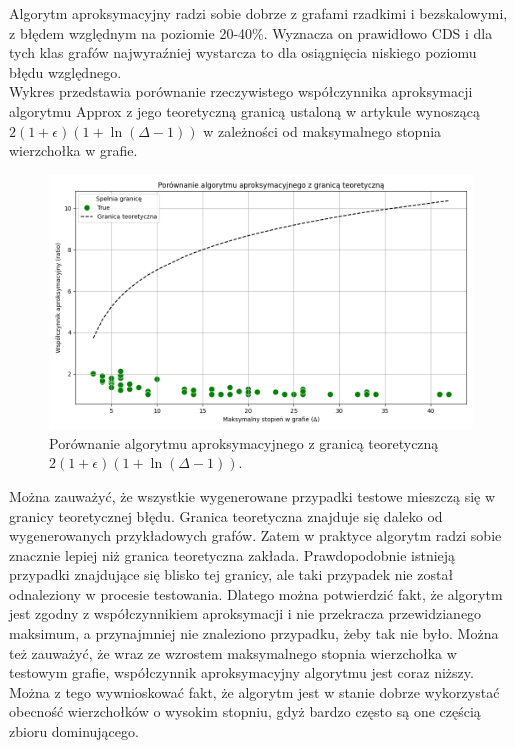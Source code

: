 Algorytm aproksymacyjny radzi sobie dobrze z grafami rzadkimi i bezskalowymi, z błędem względnym na poziomie 20-40\%. Wyznacza on prawidłowo CDS i dla tych klas grafów najwyraźniej wystarcza to dla osiągnięcia niskiego poziomu błędu względnego.\\

Wykres przedstawia porównanie rzeczywistego współczynnika aproksymacji algorytmu Approx z jego teoretyczną granicą ustaloną w artykule \cite{ILP} wynoszącą $2(1+\epsilon)(1 + \ln(\Delta - 1))$ w zależności od maksymalnego stopnia wierzchołka w grafie.

\begin{figure}[H]
    \centering
    \includegraphics[width=\textwidth]{assets/plots_approx/image.png}
    \caption{Porównanie algorytmu aproksymacyjnego z granicą teoretyczną $2(1+\epsilon)(1 + \ln(\Delta - 1))$.}
    \label{fig:approxPlot}
\end{figure}

Można zauważyć, że wszystkie wygenerowane przypadki testowe mieszczą się w granicy teoretycznej błędu. Granica teoretyczna znajduje się daleko od wygenerowanych przykładowych grafów. Zatem w praktyce algorytm radzi sobie znacznie lepiej niż granica teoretyczna zakłada. Prawdopodobnie istnieją przypadki znajdujące się blisko tej granicy, ale taki przypadek nie został odnaleziony w procesie testowania. Dlatego można potwierdzić fakt, że algorytm jest zgodny z współczynnikiem aproksymacji i nie przekracza przewidzianego maksimum, a przynajmniej nie znaleziono przypadku, żeby tak nie było. Można też zauważyć, że wraz ze wzrostem maksymalnego stopnia wierzchołka w testowym grafie, współczynnik aproksymacyjny algorytmu jest coraz niższy. Można z tego wywnioskować fakt, że algorytm jest w stanie dobrze wykorzystać obecność wierzchołków o wysokim stopniu, gdyż bardzo często są one częścią zbioru dominującego.

